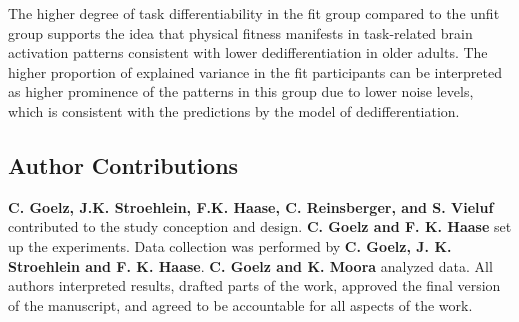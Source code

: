 \noindent The higher degree of task differentiability in the fit group compared to the unfit group supports the idea that physical fitness manifests in task-related brain activation patterns consistent with lower dedifferentiation in older adults. The higher proportion of explained variance in the fit participants can be interpreted as higher prominence of the patterns in this group due to lower noise levels, which is consistent with the predictions by the model of dedifferentiation.

\subsection*{Author Contributions}
\textbf{C. Goelz, J.K. Stroehlein, F.K. Haase, C. Reinsberger, and S. Vieluf} contributed to the study conception and design. \textbf{C. Goelz and F. K. Haase} set up the experiments. Data collection was performed by \textbf{C. Goelz, J. K. Stroehlein and F. K. Haase}. \textbf{C. Goelz and K. Moora} analyzed data. All authors interpreted results, drafted parts of the work, approved the final version of the manuscript, and agreed to be accountable for all aspects of the work.